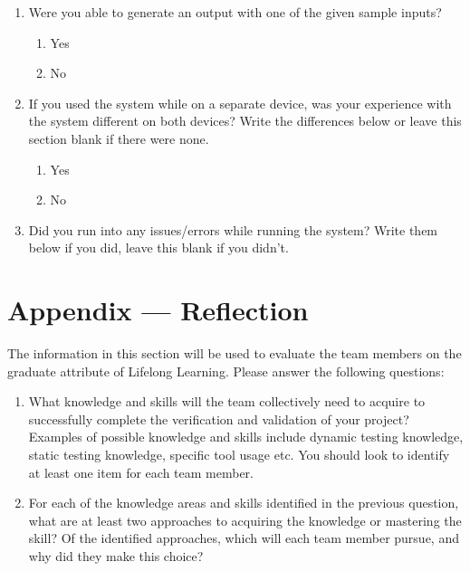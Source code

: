 \documentclass[12pt, titlepage]{article}
\begin{document}
\begin{enumerate}
\item Were you able to generate an output with one of the given sample inputs?
   \begin{enumerate}
     \item Yes
     \item No
   \end{enumerate}
  
\item If you used the system while on a separate device, was your experience with the system different on both devices? Write the differences below or leave this section blank if there were none.
   \begin{enumerate}
     \item Yes
     \item No
   \end{enumerate}

\item Did you run into any issues/errors while running the system? Write them below if you did, leave this blank if you didn't.




   
\end{enumerate}




\newpage{}
\section*{Appendix --- Reflection}

The information in this section will be used to evaluate the team members on the
graduate attribute of Lifelong Learning.  Please answer the following questions:

\begin{enumerate}
  \item What knowledge and skills will the team collectively need to acquire to
  successfully complete the verification and validation of your project?
  Examples of possible knowledge and skills include dynamic testing knowledge,
  static testing knowledge, specific tool usage etc.  You should look to
  identify at least one item for each team member.
  \item For each of the knowledge areas and skills identified in the previous
  question, what are at least two approaches to acquiring the knowledge or
  mastering the skill?  Of the identified approaches, which will each team
  member pursue, and why did they make this choice?
\end{enumerate}
\end{document}
